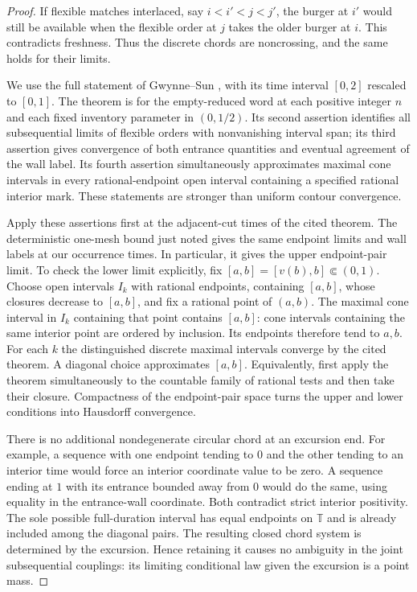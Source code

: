 \documentclass[11pt]{article}
\numberwithin{equation}{section}
\theoremstyle{definition}
\theoremstyle{remark}
\newcommand{\1}{\mathbf 1}
\begin{document}
\begin{proof}
If flexible matches interlaced, say $i<i'<j<j'$, the burger at $i'$ would
still be available when the flexible order at $j$ takes the older burger
at $i$.  This contradicts freshness.  Thus the discrete chords are
noncrossing, and the same holds for their limits.

We use the full statement of Gwynne--Sun
\cite[Theorem~1.11]{GwynneSunFKIII}, with its time interval $[0,2]$ rescaled to
$[0,1]$.  The theorem is for the empty-reduced word at each positive
integer $n$ and each fixed inventory parameter in $(0,1/2)$.  Its second
assertion identifies all subsequential limits of flexible orders with
nonvanishing interval span; its third assertion gives convergence of both
entrance quantities and eventual agreement of the wall label.  Its fourth
assertion simultaneously approximates maximal cone intervals in every
rational-endpoint open interval containing a specified rational interior
mark.  These statements are stronger than uniform contour convergence.

Apply these assertions first at the adjacent-cut times of the cited
theorem.  The deterministic one-mesh bound just noted gives the same
endpoint limits and wall labels at our occurrence times.  In particular,
it gives the upper endpoint-pair limit.  To check the lower
limit explicitly, fix $[a,b]=[v(b),b]\Subset(0,1)$.  Choose open intervals
$I_k$ with rational endpoints, containing $[a,b]$, whose closures decrease
to $[a,b]$, and fix a rational point of $(a,b)$.  The maximal cone interval
in $I_k$ containing that point contains $[a,b]$: cone intervals containing
the same interior point are ordered by inclusion.  Its endpoints
therefore tend to $a,b$.  For each $k$ the distinguished discrete maximal
intervals converge by the cited theorem.  A diagonal choice approximates
$[a,b]$.  Equivalently, first apply the theorem simultaneously to the
countable family of rational tests and then take their closure.  Compactness
of the endpoint-pair space turns the upper and lower conditions into
Hausdorff convergence.

There is no additional nondegenerate circular chord at an excursion end.
For example, a sequence with one endpoint tending to $0$ and the other
tending to an interior time would force an interior coordinate value to
be zero.  A sequence ending at $1$ with its entrance bounded away from $0$
would do the same, using equality in the entrance-wall coordinate.  Both
contradict strict interior positivity.  The sole possible full-duration
interval has equal endpoints on $\mathbb T$ and is already included among
the diagonal pairs.  The resulting closed chord system is determined by
the excursion.  Hence retaining it causes no ambiguity in the joint
subsequential couplings: its limiting conditional law given the excursion
is a point mass.
\end{proof}
\end{document}
